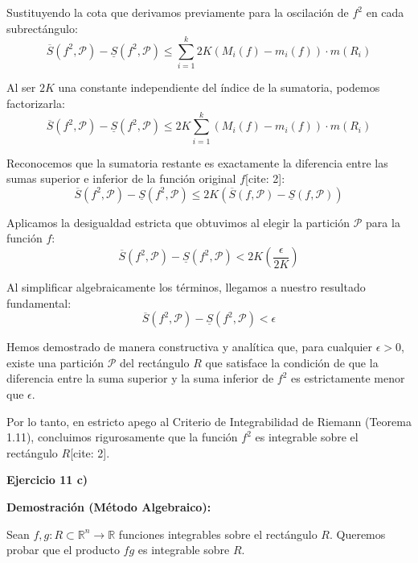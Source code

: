 \documentclass[11pt,letterpaper]{article}
\begin{document}
Sustituyendo la cota que derivamos previamente para la oscilación de $f^{2}$ en cada subrectángulo:
\begin{equation*}
\overline{S}(f^{2}, \mathcal{P}) - \underline{S}(f^{2}, \mathcal{P}) \le \sum_{i=1}^{k} 2K (M_{i}(f) - m_{i}(f)) \cdot m(R_{i})
\end{equation*}

Al ser $2K$ una constante independiente del índice de la sumatoria, podemos factorizarla:
\begin{equation*}
\overline{S}(f^{2}, \mathcal{P}) - \underline{S}(f^{2}, \mathcal{P}) \le 2K \sum_{i=1}^{k} (M_{i}(f) - m_{i}(f)) \cdot m(R_{i})
\end{equation*}

Reconocemos que la sumatoria restante es exactamente la diferencia entre las sumas superior e inferior de la función original $f$[cite: 2]:
\begin{equation*}
\overline{S}(f^{2}, \mathcal{P}) - \underline{S}(f^{2}, \mathcal{P}) \le 2K (\overline{S}(f, \mathcal{P}) - \underline{S}(f, \mathcal{P}))
\end{equation*}

Aplicamos la desigualdad estricta que obtuvimos al elegir la partición $\mathcal{P}$ para la función $f$:
\begin{equation*}
\overline{S}(f^{2}, \mathcal{P}) - \underline{S}(f^{2}, \mathcal{P}) < 2K \left( \frac{\epsilon}{2K} \right)
\end{equation*}

Al simplificar algebraicamente los términos, llegamos a nuestro resultado fundamental:
\begin{equation*}
\overline{S}(f^{2}, \mathcal{P}) - \underline{S}(f^{2}, \mathcal{P}) < \epsilon
\end{equation*}

Hemos demostrado de manera constructiva y analítica que, para cualquier $\epsilon > 0$, existe una partición $\mathcal{P}$ del rectángulo $R$ que satisface la condición de que la diferencia entre la suma superior y la suma inferior de $f^{2}$ es estrictamente menor que $\epsilon$. 

Por lo tanto, en estricto apego al Criterio de Integrabilidad de Riemann (Teorema 1.11), concluimos rigurosamente que la función $f^{2}$ es integrable sobre el rectángulo $R$[cite: 2].

\textbf{Ejercicio 11 c)}

\textbf{Demostración (Método Algebraico):}

Sean $f, g: R \subset \mathbb{R}^n \rightarrow \mathbb{R}$ funciones integrables sobre el rectángulo $R$. Queremos probar que el producto $fg$ es integrable sobre $R$.
\end{document}
